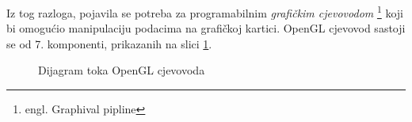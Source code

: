 Iz tog razloga, pojavila se potreba za programabilnim \emph{grafičkim cjevovodom} \footnote{engl. Graphival pipline} koji bi omogućio manipulaciju podacima na grafičkoj kartici. OpenGL cjevovod sastoji se od 7. komponenti\cite{opengl-wiki-pipeline}, prikazanih na slici \ref{fig:pipeline}.

\begin{figure}[H]
\centering{}
\caption{Dijagram toka OpenGL cjevovoda}
\label{fig:pipeline}
\end{figure}

